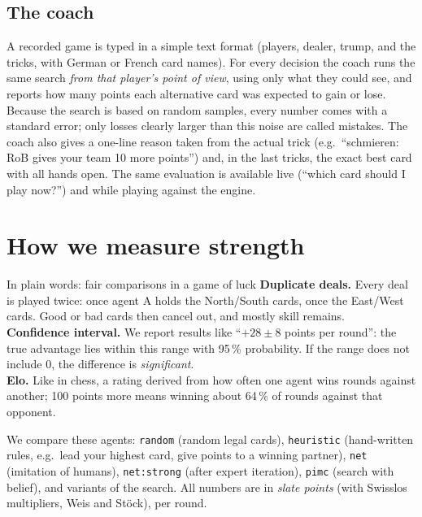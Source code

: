 \documentclass[10pt,a4paper]{article}
\begin{document}
\subsection{The coach}\label{sec:coach}
A recorded game is typed in a simple text format (players, dealer, trump, and the tricks, with German or French card
names). For every decision the coach runs the same search \emph{from that player's point of view}, using only what they
could see, and reports how many points each alternative card was expected to gain or lose. Because the search is based
on random samples, every number comes with a standard error; only losses clearly larger than this noise are called
mistakes. The coach also gives a one-line reason taken from the actual trick (e.g.\ ``schmieren: RoB gives your team 10
more points'') and, in the last tricks, the exact best card with all hands open. The same evaluation is available live
(``which card should I play now?'') and while playing against the engine.

\section{How we measure strength}\label{sec:eval}
\begin{plain}{In plain words: fair comparisons in a game of luck}
\textbf{Duplicate deals.} Every deal is played twice: once agent A holds the North/South cards, once the East/West
cards. Good or bad cards then cancel out, and mostly skill remains.\\
\textbf{Confidence interval.} We report results like ``$+28 \pm 8$ points per round'': the true advantage lies within
this range with 95\,\% probability. If the range does not include 0, the difference is \emph{significant}.\\
\textbf{Elo.} Like in chess, a rating derived from how often one agent wins rounds against another; 100 points more
means winning about 64\,\% of rounds against that opponent.
\end{plain}

We compare these agents: \texttt{random} (random legal cards), \texttt{heuristic} (hand-written rules, e.g.\ lead your
highest card, give points to a winning partner), \texttt{net} (imitation of humans), \texttt{net:strong} (after expert
iteration), \texttt{pimc} (search with belief), and variants of the search. All numbers are in \emph{slate points}
(with Swisslos multipliers, Weis and St\"ock), per round.
\end{document}
